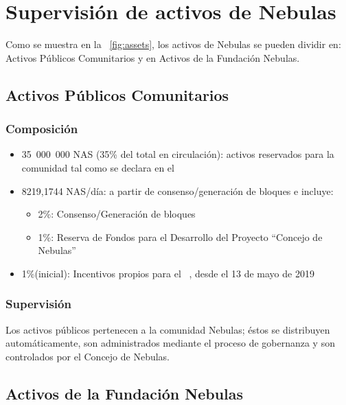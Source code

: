 \section{Supervisión de activos de Nebulas}

\label{supervision}

Como se muestra en la \figurename~\ref{fig:assets}, los activos de Nebulas se pueden dividir en: Activos Públicos Comunitarios y en Activos de la Fundación Nebulas.

\subsection{Activos Públicos Comunitarios}

\subsubsection{Composición}

\begin{itemize}
	\item 35 000 000 NAS (35\% del total en circulación): activos reservados para la comunidad tal como se declara en el \ntechw
    \item 8219,1744 NAS/día: a partir de consenso/generación de bloques e incluye:
	    \begin{itemize}
			\item 2\%: Consenso/Generación de bloques
			\item 1\%: Reserva de Fondos para el Desarrollo del Proyecto “Concejo de Nebulas”
		\end{itemize}
	\item 1\%(inicial): Incentivos propios para el \dip~\cite{mauvepaper}, desde el 13 de mayo de 2019
\end{itemize}

\subsubsection{Supervisión}

Los activos públicos pertenecen a la comunidad Nebulas; éstos se distribuyen automáticamente, son administrados mediante el proceso de gobernanza \onchain y son controlados por el Concejo de Nebulas.

\subsection{Activos de la Fundación Nebulas}

